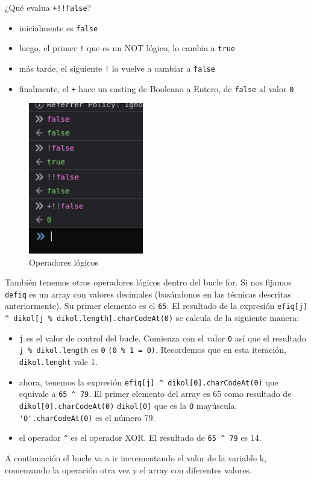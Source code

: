 \documentclass[15pt]{article}
\begin{document}
	¿Qué evalua \verb*|+!!false|?
	\begin{itemize}
		\item inicialmente es \verb*|false|
		\item luego, el primer \verb*|!| que es un NOT lógico, lo cambia a \verb*|true|
		\item más tarde, el siguiente \verb*|!| lo vuelve a cambiar a \verb*|false|
		\item finalmente, el \verb*|+| hace un casting de Booleano a Entero, de \verb*|false| al valor \verb*|0|
	\end{itemize}
	
	\begin{figure}[H]
		\centering
		\includegraphics[width=5cm]{images/operators.png}
		\caption{Operadores lógicos}
	\end{figure}

	También tenemos otros operadores lógicos dentro del bucle for. Si nos fijamos \verb*|defiq| es un array con valores decimales (basándonos en las técnicas descritas anteriormente). Su primer elemento es el \verb*|65|. El resultado de la expresión \verb*|efiq[j] ^ dikol[j % dikol.length].charCodeAt(0)| se calcula de la siguiente manera:
	
	\begin{itemize}
		\item \verb*|j| es el valor de control del bucle. Comienza con el valor \verb*|0| así que el resultado \verb*|j % dikol.length| es \verb*|0| \verb*|(0 % 1 = 0)|. Recordemos que en esta iteración, \verb*|dikol.lenght| vale 1.
		\item ahora, tenemos la expresión \verb*|efiq[j] ^ dikol[0].charCodeAt(0)| que equivale a \verb*|65 ^ 79|. El primer elemento del array es 65 como resultado de \verb*|dikol[0].charCodeAt(0)| \verb*|dikol[0]| que es la \verb*|O| mayúscula. \verb*|'O'.charCodeAt(0)| es el número 79.
		\item el operador \verb*|^| es el operador XOR. El resultado de \verb*|65 ^ 79| es 14.
	\end{itemize}
	A continuación el bucle va a ir incrementando el valor de la variable k, comenzando la operación otra vez y el array con diferentes valores.
	
\end{document}
